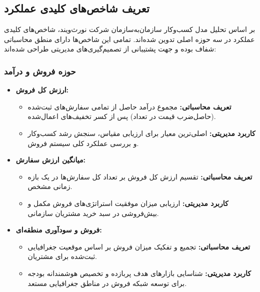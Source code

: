\documentclass[14pt,a4paper]{extarticle}
\begin{document}
\addtocounter{footnote}{-4}
\addtocounter{footnote}{1}
\addtocounter{footnote}{1}
\addtocounter{footnote}{1}
\addtocounter{footnote}{1}
	
	\newpage
	\subsection[تعریف شاخص‌های کلیدی عملکرد]{تعریف شاخص‌های کلیدی عملکرد}
	
	
	
	بر اساس تحلیل مدل کسب‌وکار سازمان‌به‌سازمان شرکت نورث‌ویند، شاخص‌های کلیدی عملکرد در سه حوزه اصلی تدوین شده‌اند. تمامی این شاخص‌ها دارای منطق محاسباتی شفاف بوده و جهت پشتیبانی از تصمیم‌گیری‌های مدیریتی طراحی شده‌اند:
	
	\subsubsection{حوزه فروش و درآمد}
	\begin{itemize}
		\item \textbf{ارزش کل فروش:}
		\begin{itemize}
			\item \textbf{تعریف محاسباتی:} مجموع درآمد حاصل از تمامی سفارش‌های ثبت‌شده (حاصل‌ضرب قیمت در تعداد) پس از کسر تخفیف‌های اعمال‌شده.
			\item \textbf{کاربرد مدیریتی:} اصلی‌ترین معیار برای ارزیابی مقیاس، سنجش رشد کسب‌وکار و بررسی عملکرد کلی سیستم فروش.
		\end{itemize}
		
		\item \textbf{میانگین ارزش سفارش:}
		\begin{itemize}
			\item \textbf{تعریف محاسباتی:} تقسیم ارزش کل فروش بر تعداد کل سفارش‌ها در یک بازه زمانی مشخص.
			\item \textbf{کاربرد مدیریتی:} ارزیابی میزان موفقیت استراتژی‌های فروش مکمل و بیش‌فروشی در سبد خرید مشتریان سازمانی.
		\end{itemize}
		
		\item \textbf{فروش و سودآوری منطقه‌ای:}
		\begin{itemize}
			\item \textbf{تعریف محاسباتی:} تجمیع و تفکیک میزان فروش بر اساس موقعیت جغرافیایی ثبت‌شده برای مشتریان.
			\item \textbf{کاربرد مدیریتی:} شناسایی بازارهای هدف پربازده و تخصیص هوشمندانه بودجه برای توسعه شبکه فروش در مناطق جغرافیایی مستعد.
		\end{itemize}
	\end{itemize}
	
\end{document}
